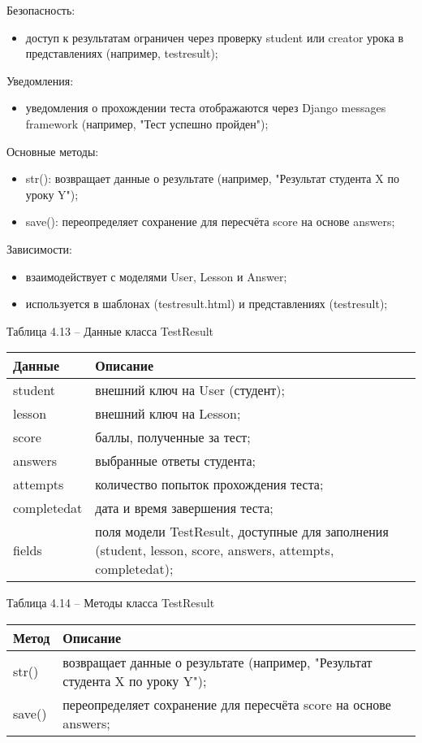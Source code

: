 Безопасность: 
\begin{itemize}
	\item доступ к результатам ограничен через проверку student или creator урока в представлениях (например, testresult); 
\end{itemize}

Уведомления: 
\begin{itemize}
	\item уведомления о прохождении теста отображаются через Django messages framework (например, "Тест успешно пройден"); 
\end{itemize}

Основные методы: 
\begin{itemize}
	\item str(): возвращает данные о результате (например, "Результат студента X по уроку Y"); 
	\item save(): переопределяет сохранение для пересчёта score на основе answers; 
\end{itemize}

Зависимости: 
\begin{itemize}
	\item взаимодействует с моделями User, Lesson и Answer; 
	\item используется в шаблонах (testresult.html) и представлениях (testresult); 
\end{itemize}

Таблица 4.13 – Данные класса TestResult \\
\begin{tabular}{|p{4cm}|p{8cm}|}
	\hline
	Данные & Описание \\
	\hline
	student & внешний ключ на User (студент); \\
	lesson & внешний ключ на Lesson; \\
	score & баллы, полученные за тест; \\
	answers & выбранные ответы студента; \\
	attempts & количество попыток прохождения теста; \\
	completedat & дата и время завершения теста; \\
	fields & поля модели TestResult, доступные для заполнения (student, lesson, score, answers, attempts, completedat); \\
	\hline
\end{tabular}

Таблица 4.14 – Методы класса TestResult \\
\begin{tabular}{|p{4cm}|p{8cm}|}
	\hline
	Метод & Описание \\
	\hline
	str() & возвращает данные о результате (например, "Результат студента X по уроку Y"); \\
	save() & переопределяет сохранение для пересчёта score на основе answers; \\
	\hline
\end{tabular}

